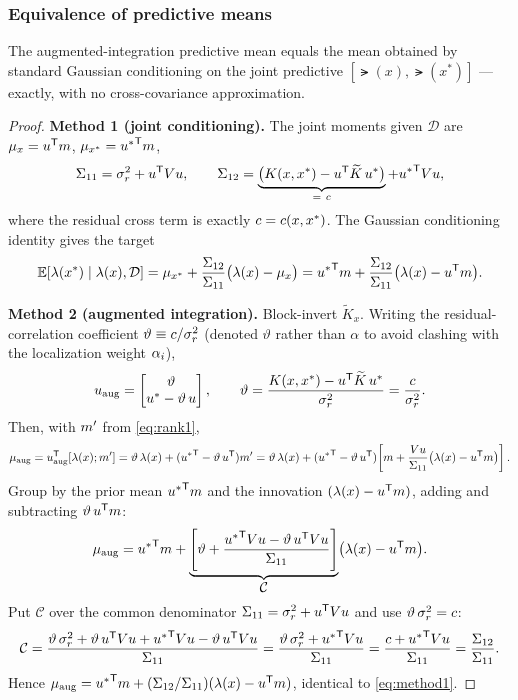 \subsubsection{Equivalence of predictive means}
\begin{theorem}\label{thm:predmean-equiv}
The augmented-integration predictive mean equals the mean obtained by standard
Gaussian conditioning on the joint predictive $[\lat(x),\lat(x^*)]$ --- exactly,
with no cross-covariance approximation.
\end{theorem}
\begin{proof}
\textbf{Method 1 (joint conditioning).} The joint moments given $\mathcal{D}$ are
$\mu_x=u^{\mathsf{T}}m$, $\mu_{x^*}={u^*}^{\mathsf{T}}m$,
\[
  \Sigma_{11}=\varr+\pv\transpose\vV\pv,\qquad
  \Sigma_{12}=\underbrace{\bigl(\Kf(x,x^*)-\pv\transpose\Ktil\,\pv^*\bigr)}_{=\ \ccond}+{\pv^*}\transpose\vV\pv,
\]
where the residual cross term is exactly $c=c(x,x^*)$. The Gaussian
conditioning identity gives the target
\begin{equation}\label{eq:method1}
  \mathbb{E}[\lambda(x^*)\mid\lambda(x),\mathcal{D}]
  =\mu_{x^*}+\frac{\Sigma_{12}}{\Sigma_{11}}\bigl(\lambda(x)-\mu_x\bigr)
  ={u^*}^{\mathsf{T}}m+\frac{\Sigma_{12}}{\Sigma_{11}}\bigl(\lambda(x)-u^{\mathsf{T}}m\bigr).
\end{equation}

\textbf{Method 2 (augmented integration).} Block-invert $\widetilde{K}_x$. Writing
the residual-correlation coefficient $\vartheta\equiv c/\sigma_{r}^{2}$ (denoted
$\vartheta$ rather than $\alpha$ to avoid clashing with the localization weight
$\alpha_i$),
\[
  u_{\mathrm{aug}}=\begin{bmatrix}\vartheta\\ u^*-\vartheta\,u\end{bmatrix},
  \qquad \vartheta=\frac{K(x,x^*)-u^{\mathsf{T}}\widetilde{K}\,u^*}{\sigma_{r}^{2}}=\frac{c}{\sigma_{r}^{2}}.
\]
Then, with $m'$ from \eqref{eq:rank1},
\[
  \mu_{\mathrm{aug}}=u_{\mathrm{aug}}^{\mathsf{T}}[\lambda(x);m']
  =\vartheta\,\lambda(x)+({u^*}^{\mathsf{T}}-\vartheta\,u^{\mathsf{T}})m'
  =\vartheta\,\lambda(x)+({u^*}^{\mathsf{T}}-\vartheta\,u^{\mathsf{T}})\!\left[m+\frac{Vu}{\Sigma_{11}}\bigl(\lambda(x)-u^{\mathsf{T}}m\bigr)\right].
\]
Group by the prior mean ${u^*}^{\mathsf{T}}m$ and the innovation
$(\lambda(x)-u^{\mathsf{T}}m)$, adding and subtracting $\vartheta\,u^{\mathsf{T}}m$:
\[
  \mu_{\mathrm{aug}}={u^*}^{\mathsf{T}}m
   +\underbrace{\left[\vartheta+\frac{{u^*}^{\mathsf{T}}Vu-\vartheta\,u^{\mathsf{T}}Vu}{\Sigma_{11}}\right]}_{\displaystyle \mathcal{C}}
   \bigl(\lambda(x)-u^{\mathsf{T}}m\bigr).
\]
Put $\mathcal{C}$ over the common denominator $\Sigma_{11}=\sigma_{r}^{2}+u^{\mathsf{T}}Vu$
and use $\vartheta\,\sigma_{r}^{2}=c$:
\[
  \mathcal{C}=\frac{\vartheta\,\sigma_{r}^{2}+\vartheta\,u^{\mathsf{T}}Vu+{u^*}^{\mathsf{T}}Vu-\vartheta\,u^{\mathsf{T}}Vu}{\Sigma_{11}}
   =\frac{\vartheta\,\sigma_{r}^{2}+{u^*}^{\mathsf{T}}Vu}{\Sigma_{11}}
   =\frac{c+{u^*}^{\mathsf{T}}Vu}{\Sigma_{11}}
   =\frac{\Sigma_{12}}{\Sigma_{11}}.
\]
Hence $\mu_{\mathrm{aug}}={u^*}^{\mathsf{T}}m+(\Sigma_{12}/\Sigma_{11})(\lambda(x)-u^{\mathsf{T}}m)$,
identical to \eqref{eq:method1}.
\end{proof}

